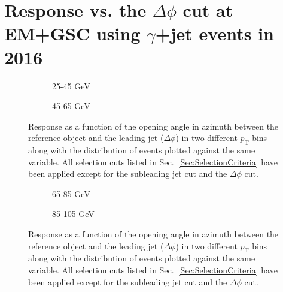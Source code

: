 \chapter{Response vs. the $\Delta\phi$ cut at EM+GSC using $\gamma$+jet events in 2016}

\begin{figure}[!ht]
\centering
\begin{subfigure}{.5\textwidth}
\centering
{}
\caption{25-45 GeV}
\end{subfigure}%
\begin{subfigure}{.5\textwidth}
\centering
{}
\caption{45-65 GeV}
\end{subfigure}
  \caption[Response as a function of the $\Delta\phi$ cut, 25-45 and 45-65 GeV bins]
  {\small Response as a function of the opening angle in azimuth between the reference object and the leading jet ($\Delta\phi$) in two different $p_{\mathrm T}$ bins along with the distribution of events plotted against the same variable.  All selection cuts listed in Sec.~\ref{Sec:SelectionCriteria} have been applied except for the subleading jet cut and the $\Delta\phi$ cut.  }
  \label{plot:GJetEMdPhi25-45_2016App}
\end{figure}

\begin{figure}[!ht]
  \centering
  \begin{subfigure}{.5\textwidth}
    \centering
    \caption{65-85 GeV}
  \end{subfigure}%
  \begin{subfigure}{.5\textwidth}
    \centering
    \caption{85-105 GeV}
  \end{subfigure}
  \caption[Response as a function of the $\Delta\phi$ cut, 65-85 and 85-105 GeV bins]
  {\small Response as a function of the opening angle in azimuth between the reference object and the leading jet ($\Delta\phi$) in two different $p_{\mathrm T}$ bins along with the distribution of events plotted against the same variable.  All selection cuts listed in Sec.~\ref{Sec:SelectionCriteria} have been applied except for the subleading jet cut and the $\Delta\phi$ cut.  }
  \label{plot:GJetEMdPhi65-85_2016App}
\end{figure}

